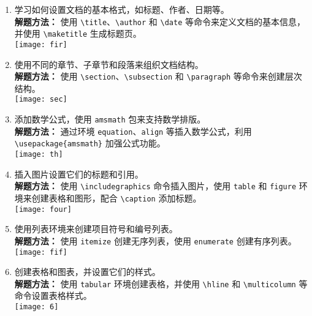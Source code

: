 \documentclass[12pt]{article}
\begin{document}
\begin{enumerate}
    \item 学习如何设置文档的基本格式，如标题、作者、日期等。\\
    \textbf{解题方法：} 使用 \texttt{\textbackslash title}、\texttt{\textbackslash author} 和 \texttt{\textbackslash date} 等命令来定义文档的基本信息，并使用 \texttt{\textbackslash maketitle} 生成标题页。\\
    \texttt{[image: fir]}
    
    \item 使用不同的章节、子章节和段落来组织文档结构。\\
    \textbf{解题方法：} 使用 \texttt{\textbackslash section}、\texttt{\textbackslash subsection} 和 \texttt{\textbackslash paragraph} 等命令来创建层次结构。\\
    \texttt{[image: sec]}
    
    \item 添加数学公式，使用 \texttt{amsmath} 包来支持数学排版。\\
    \textbf{解题方法：} 通过环境 \texttt{equation}、\texttt{align} 等插入数学公式，利用 \texttt{\textbackslash usepackage\{amsmath\}} 加强公式功能。\\
    \texttt{[image: th]}
    
    \item 插入图片设置它们的标题和引用。\\
    \textbf{解题方法：} 使用 \texttt{\textbackslash includegraphics} 命令插入图片，使用 \texttt{table} 和 \texttt{figure} 环境来创建表格和图形，配合 \texttt{\textbackslash caption} 添加标题。\\
    \texttt{[image: four]}
    
    \item 使用列表环境来创建项目符号和编号列表。\\
    \textbf{解题方法：} 使用 \texttt{itemize} 创建无序列表，使用 \texttt{enumerate} 创建有序列表。\\
    \texttt{[image: fif]}
    
    \item 创建表格和图表，并设置它们的样式。\\
    \textbf{解题方法：} 使用 \texttt{tabular} 环境创建表格，并使用 \texttt{\textbackslash hline} 和 \texttt{\textbackslash multicolumn} 等命令设置表格样式。\\
    \texttt{[image: 6]}
    

\end{enumerate}
\end{document}
